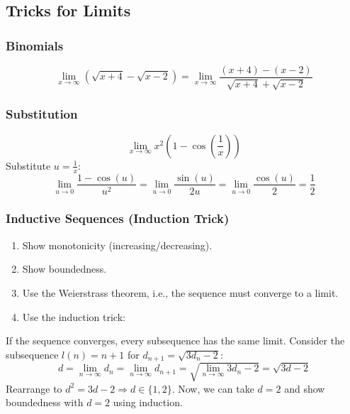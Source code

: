 \subsection{Tricks for Limits}
\subsubsection{Binomials}
\[
\lim_{x \to \infty} \left(\sqrt{x + 4} - \sqrt{x - 2}\right) = \lim_{x \to \infty} \frac{(x+4)-(x-2)}{\sqrt{x+4}+\sqrt{x-2}}
\]

\subsubsection{Substitution}
\[
\lim_{x \to \infty} x^2 \left(1-\cos\left(\frac{1}{x}\right)\right)
\]
Substitute \( u = \frac{1}{x} \):
\[
\lim_{u \to 0} \frac{1 - \cos(u)}{u^2} = \lim_{u \to 0} \frac{\sin(u)}{2u} = \lim_{u\to 0} \frac{\cos(u)}{2} = \frac{1}{2}
\]

\subsubsection{Inductive Sequences (Induction Trick)}
\begin{enumerate}
  \item Show monotonicity (increasing/decreasing).
  \item Show boundedness.
  \item Use the Weierstrass theorem, i.e., the sequence must converge to a limit.
  \item Use the induction trick:
\end{enumerate}
If the sequence converges, every subsequence has the same limit. Consider the subsequence \(l(n) = n + 1\) for \(d_{n+1} = \sqrt{3d_n - 2}\):
\[
d = \lim_{n \to \infty} d_n = \lim_{n \to \infty} d_{n+1} = \sqrt{\lim_{n \to \infty} 3d_n -2} = \sqrt{3d -2}
\]
Rearrange to \( d^2 = 3d -2 \Rightarrow d \in \{1,2\} \). Now, we can take \( d = 2 \) and show boundedness with \( d=2 \) using induction.
